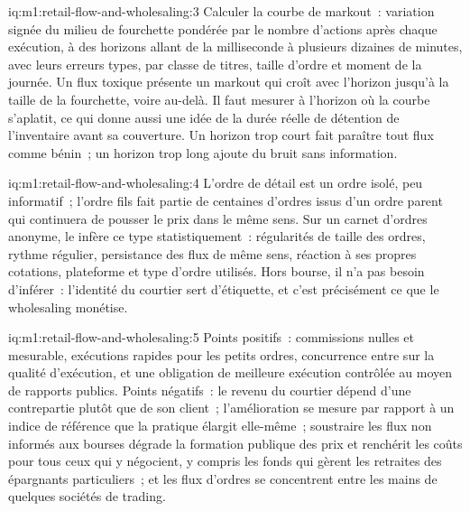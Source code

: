 \begin{solution}{iq:m1:retail-flow-and-wholesaling:3}
Calculer la courbe de markout~: variation signée du milieu de fourchette pondérée par
le nombre d'actions après chaque exécution, à des horizons allant de la milliseconde à
plusieurs dizaines de minutes, avec leurs erreurs types, par classe de titres, taille
d'ordre et moment de la journée. Un flux toxique présente un markout qui croît avec
l'horizon jusqu'à la taille de la fourchette, voire au-delà. Il faut mesurer à l'horizon
où la courbe s'aplatit, ce qui donne aussi une idée de la durée réelle de détention de
l'inventaire avant sa couverture. Un horizon trop court fait paraître tout flux comme bénin~; un horizon trop long ajoute du bruit sans information.
\end{solution}

\begin{solution}{iq:m1:retail-flow-and-wholesaling:4}
L'ordre de détail est un ordre isolé, peu informatif~; l'ordre fils fait partie
de centaines d'ordres issus d'un ordre parent qui continuera de pousser le prix dans le même sens.
Sur un carnet d'ordres anonyme, le  infère ce type statistiquement~:
régularités de taille des ordres, rythme régulier, persistance des flux de même sens,
réaction à ses propres cotations, plateforme et type d'ordre utilisés. Hors bourse, il n'a pas besoin
d'inférer~: l'identité du courtier sert d'étiquette, et c'est précisément ce que le
wholesaling monétise.
\end{solution}

\begin{solution}{iq:m1:retail-flow-and-wholesaling:5}
Points positifs~: commissions nulles et  mesurable, exécutions rapides
pour les petits ordres, concurrence entre  sur la qualité d'exécution, et une
obligation de meilleure exécution contrôlée au moyen de rapports publics. Points négatifs~: le revenu du courtier
dépend d'une contrepartie plutôt que de son client~; l'amélioration se mesure par rapport
à un indice de référence que la pratique élargit elle-même~; soustraire les flux non informés
aux bourses dégrade la formation publique des prix et renchérit les coûts pour
tous ceux qui y négocient, y compris les fonds qui gèrent les retraites des épargnants
particuliers~; et les flux d'ordres se concentrent entre les mains de quelques sociétés de trading.
\end{solution}

